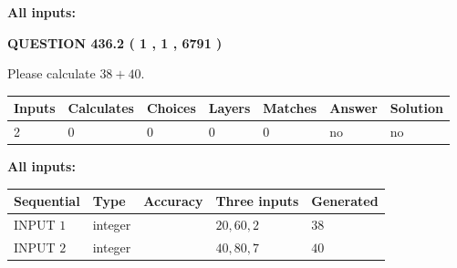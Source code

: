 \documentclass[12pt]{article}
\begin{document}
   
   
   
\noindent{}
   
   
   
   
\noindent\vspace{0.1in}\hspace{-0.08in} {\textbf{\Large{All inputs: }}}
   
   
  
\vspace{0.2in}
  
{\textbf{\Large{QUESTION
436.2 
 ( 1 , 1 , 6791 )
}}}
  
  
 
Please calculate $ %
38 +  %
40 $.
 
 
   
   
   
   
\noindent\begin{tabular}{|l|l|l|l|l|l|l|}
 \hline
Inputs & Calculates & Choices & Layers & Matches & Answer & Solution \\ \hline
 2  & 
 0  & 
 0
  & 
 0  & 
 0  & 
  no & 
  no 
  \\ \hline
 \end{tabular}
   
   
   
   
\noindent{}
   
   
   
   
\noindent\vspace{0.1in}\hspace{-0.08in} {\textbf{\Large{All inputs: }}}
   
   
  
  
\noindent\begin{tabular}{|l|l|l|l|l|}
\hline
 Sequential & Type & Accuracy & Three inputs & Generated \\ 
\hline
 
 
  INPUT $  1 $ & integer &  & $
 20
 , 
 60
 , 
 2
 $ & $ 38 $ 
 \\  \hline  
 
 
  INPUT $  2 $ & integer &  & $
 40
 , 
 80
 , 
 7
 $ & $ 40 $ 
 \\  \hline  
 \end{tabular}
   
   
   
   
   
   
 \vspace{0.2in}
 
\end{document}
